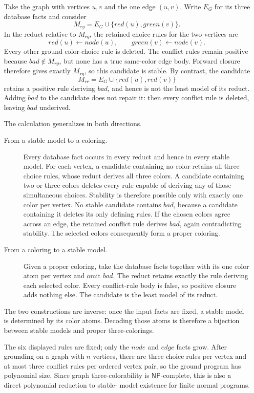 Take the graph with vertices \(u,v\) and the one edge \((u,v)\).  Write
\(E_G\) for its three database facts and consider
\[
 M_{rg}=E_G\cup\{red(u),green(v)\}.
\]
In the reduct relative to \(M_{rg}\), the retained choice rules for the two
vertices are
\[
 red(u)\leftarrow node(u),
 \qquad
 green(v)\leftarrow node(v).
\]
Every other ground color-choice rule is deleted.  The conflict rules remain
positive because \(bad\notin M_{rg}\), but none has a true same-color edge
body.  Forward closure therefore gives exactly \(M_{rg}\), so this candidate is
stable.  By contrast, the candidate
\[
 M_{rr}=E_G\cup\{red(u),red(v)\}
\]
retains a positive rule deriving \(bad\), and hence is not the least model of
its reduct.  Adding \(bad\) to the candidate does not repair it: then every
conflict rule is deleted, leaving \(bad\) underived.

The calculation generalizes in both directions.
\begin{description}
\item[From a stable model to a coloring.]
Every database fact occurs in every reduct and hence in every stable model.
For each vertex, a candidate containing no color retains all three choice
rules, whose reduct derives all three colors.  A candidate containing two or
three colors deletes every rule capable of deriving any of those simultaneous
choices.  Stability is therefore possible only with exactly one color per
vertex.  No stable candidate contains \(bad\), because a candidate containing
it deletes its only defining rules.  If the chosen colors agree across an
edge, the retained conflict rule derives \(bad\), again contradicting
stability.  The selected colors consequently form a proper coloring.
\item[From a coloring to a stable model.]
Given a proper coloring, take the database facts together with its one color
atom per vertex and omit \(bad\).  The reduct retains exactly the rule deriving
each selected color.  Every conflict-rule body is false, so positive closure
adds nothing else.  The candidate is the least model of its reduct.
\end{description}
The two constructions are inverse: once the input facts are fixed, a stable
model is determined by its color atoms.  Decoding those atoms is therefore a
bijection between stable models and proper three-colorings.

The six displayed rules are fixed; only the \(node\) and \(edge\) facts grow.
After grounding on a graph with \(n\) vertices, there are three choice rules per
vertex and at most three conflict rules per ordered vertex pair, so the ground
program has polynomial size.  Since graph three-colorability is
\(\mathsf{NP}\)-complete, this is also a direct polynomial reduction to stable-
model existence for finite normal programs.

